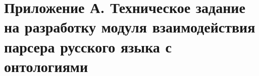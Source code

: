 \indent \section{Приложение А. Техническое задание на разработку модуля взаимодействия парсера русского языка с онтологиями}